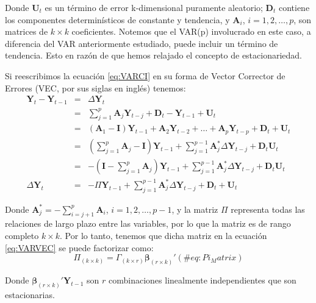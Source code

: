 \documentclass[
]{book}
\begin{document}
Donde \(\mathbf{U}_t\) es un término de error k-dimensional puramente
aleatorio; \(\mathbf{D}_t\) contiene los componentes determinísticos de
constante y tendencia, y \(\mathbf{A}_i\), \(i = 1, 2, \ldots, p\), son
matrices de \(k \times k\) coeficientes. Notemos que el VAR(p) involucrado
en este caso, a diferencia del VAR anteriormente estudiado, puede
incluir un término de tendencia. Esto en razón de que hemos relajado el
concepto de estacionariedad.

Si reescribimos la ecuación \eqref{eq:VARCI} en su forma de Vector
Corrector de Errores (VEC, por sus siglas en inglés) tenemos:
\begin{eqnarray}
    \mathbf{Y}_t - \mathbf{Y}_{t-1} & = & \Delta \mathbf{Y}_t \nonumber \\
    & = & \sum_{j=1}^p \mathbf{A}_j \mathbf{Y}_{t-j} + \mathbf{D}_t - \mathbf{Y}_{t-1} + \mathbf{U}_t \nonumber \\
    & = & (\mathbf{A}_1 - \mathbf{I}) \mathbf{Y}_{t-1} + \mathbf{A}_2 \mathbf{Y}_{t-2} + \ldots + \mathbf{A}_p \mathbf{Y}_{t-p} + \mathbf{D}_t + \mathbf{U}_t \nonumber \\
    & = & \left( \sum_{j=1}^{p} \mathbf{A}_j - \mathbf{I} \right) \mathbf{Y}_{t-1} + \sum_{j=1}^{p-1} \mathbf{A}^*_j \Delta \mathbf{Y}_{t-j} + \mathbf{D}_t \mathbf{U}_t \nonumber \\
    & = & - \left( \mathbf{I} - \sum_{j=1}^{p} \mathbf{A}_j \right) \mathbf{Y}_{t-1} + \sum_{j=1}^{p-1} \mathbf{A}^*_j \Delta \mathbf{Y}_{t-j} + \mathbf{D}_t \mathbf{U}_t \nonumber \\
    \Delta \mathbf{Y}_t & = & - \Pi \mathbf{Y}_{t-1} + \sum_{j=1}^{p-1} \mathbf{A}^*_j \Delta \mathbf{Y}_{t-j} + \mathbf{D}_t + \mathbf{U}_t
    \label{eq:VARVEC}
\end{eqnarray}

Donde \(\mathbf{A}_j^* = - \sum_{i=j+1}^p \mathbf{A}_i\),
\(i = 1, 2, \ldots, p-1\), y la matriz \(\Pi\) representa todas las
relaciones de largo plazo entre las variables, por lo que la matriz es
de rango completo \(k \times k\). Por lo tanto, tenemos que dicha matriz
en la ecuación \eqref{eq:VARVEC} se puede factorizar como:
\begin{equation}
    \Pi_{(k \times k)} = \Gamma_{(k \times r)} \boldsymbol{\beta}_{(r \times k)}'
    (\#eq:Pi_Matrix)
\end{equation}

Donde \(\boldsymbol{\beta}_{(r \times k)}' \mathbf{Y}_{t-1}\) son \(r\)
combinaciones linealmente independientes que son estacionarias.
\end{document}
